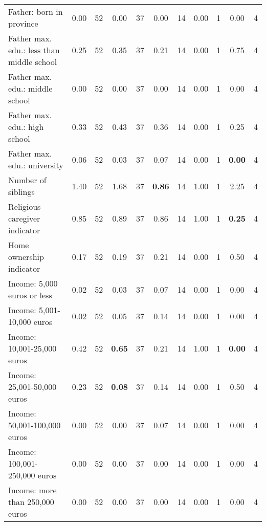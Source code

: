 \begin{tabular}{l c c c c c c c c c c}
Father: born in province &      0.00 &        52 &      0.00 &        37 &      0.00 &        14 &      0.00 &         1 &      0.00 &         4 \\
Father max. edu.: less than middle school &      0.25 &        52 &      0.35 &        37 &      0.21 &        14 &      0.00 &         1 &      0.75 &         4 \\
Father max. edu.: middle school &      0.00 &        52 &      0.00 &        37 &      0.00 &        14 &      0.00 &         1 &      0.00 &         4 \\
Father max. edu.: high school &      0.33 &        52 &      0.43 &        37 &      0.36 &        14 &      0.00 &         1 &      0.25 &         4 \\
Father max. edu.: university &      0.06 &        52 &      0.03 &        37 &      0.07 &        14 &      0.00 &         1 & \textbf{     0.00} &         4 \\
Number of siblings &      1.40 &        52 &      1.68 &        37 & \textbf{     0.86} &        14 &      1.00 &         1 &      2.25 &         4 \\
Religious caregiver indicator &      0.85 &        52 &      0.89 &        37 &      0.86 &        14 &      1.00 &         1 & \textbf{     0.25} &         4 \\
Home ownership indicator &      0.17 &        52 &      0.19 &        37 &      0.21 &        14 &      0.00 &         1 &      0.50 &         4 \\
Income: 5,000 euros or less &      0.02 &        52 &      0.03 &        37 &      0.07 &        14 &      0.00 &         1 &      0.00 &         4 \\
Income: 5,001-10,000 euros &      0.02 &        52 &      0.05 &        37 &      0.14 &        14 &      0.00 &         1 &      0.00 &         4 \\
Income: 10,001-25,000 euros &      0.42 &        52 & \textbf{     0.65} &        37 &      0.21 &        14 &      1.00 &         1 & \textbf{     0.00} &         4 \\
Income: 25,001-50,000 euros &      0.23 &        52 & \textbf{     0.08} &        37 &      0.14 &        14 &      0.00 &         1 &      0.50 &         4 \\
Income: 50,001-100,000 euros &      0.00 &        52 &      0.00 &        37 &      0.07 &        14 &      0.00 &         1 &      0.00 &         4 \\
Income: 100,001-250,000 euros &      0.00 &        52 &      0.00 &        37 &      0.00 &        14 &      0.00 &         1 &      0.00 &         4 \\
Income: more than 250,000 euros &      0.00 &        52 &      0.00 &        37 &      0.00 &        14 &      0.00 &         1 &      0.00 &         4 \\
\bottomrule
\end{tabular}
